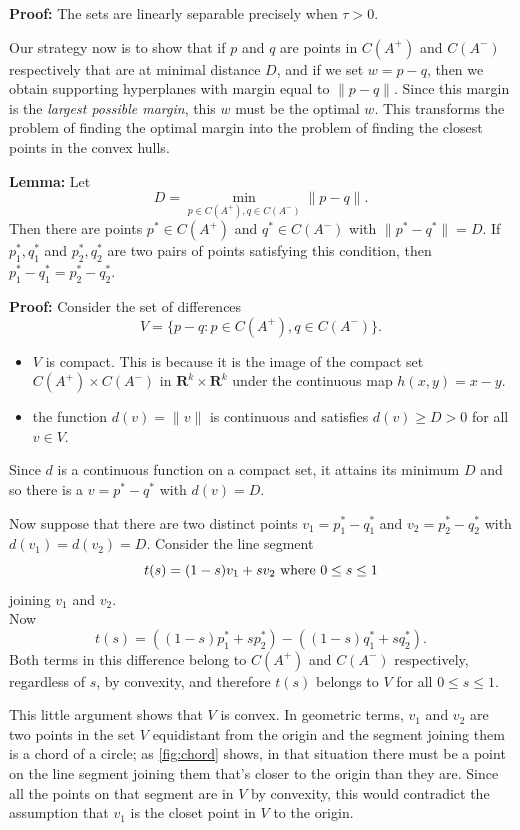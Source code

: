 \documentclass[
]{article}
\begin{document}
\textbf{Proof:} The sets are linearly separable precisely when
\(\tau>0\).

Our strategy now is to show that if \(p\) and \(q\) are points in
\(C(A^{+})\) and \(C(A^{-})\) respectively that are at minimal distance
\(D\), and if we set \(w=p-q\), then we obtain supporting hyperplanes
with margin equal to \(\|p-q\|\). Since this margin is the \emph{largest
possible margin}, this \(w\) must be the optimal \(w\). This transforms
the problem of finding the optimal margin into the problem of finding
the closest points in the convex hulls.

\textbf{Lemma:} Let \[
D=\min_{p\in C(A^{+}),q\in C(A^{-})} \|p-q\|.
\] Then there are points \(p^*\in C(A^{+})\) and \(q^{*}\in C(A^{-})\)
with \(\|p^{*}-q^{*}\|=D\). If \(p_1^{*},q_1^{*}\) and
\(p_2^{*},q_2^{*}\) are two pairs of points satisfying this condition,
then \(p_1^{*}-q_1^{*}=p_2^{*}-q_{2}^{*}\).

\textbf{Proof:} Consider the set of differences \[
V = \{p-q: p\in C(A^{+}),q\in C(A^{-})\}.
\]

\begin{itemize}
\item
  \(V\) is compact. This is because it is the image of the compact set
  \(C(A^{+})\times C(A^{-})\) in \(\mathbf{R}^{k}\times\mathbf{R}^{k}\)
  under the continuous map \(h(x,y)=x-y\).
\item
  the function \(d(v)=\|v\|\) is continuous and satisfies
  \(d(v)\ge D>0\) for all \(v\in V\).
\end{itemize}

Since \(d\) is a continuous function on a compact set, it attains its
minimum \(D\) and so there is a \(v=p^{*}-q^{*}\) with \(d(v)=D\).

Now suppose that there are two distinct points \(v_1=p_1^*-q_1^*\) and
\(v_2=p_2^*-q_2^*\) with \(d(v_1)=d(v_2)=D\). Consider the line segment
\[
t(s) = (1-s)v_1+sv_2\hbox{ where }0\le s\le 1
\] joining \(v_1\) and \(v_2\).\\
Now \[
t(s) = ((1-s)p_1^*+sp_2^*)-((1-s)q_1^*+sq_2^*).
\] Both terms in this difference belong to \(C(A^{+})\) and \(C(A^{-})\)
respectively, regardless of \(s\), by convexity, and therefore \(t(s)\)
belongs to \(V\) for all \(0\le s\le 1\).

This little argument shows that \(V\) is convex. In geometric terms,
\(v_1\) and \(v_2\) are two points in the set \(V\) equidistant from the
origin and the segment joining them is a chord of a circle; as
\cref{fig:chord} shows, in that situation there must be a point on the
line segment joining them that's closer to the origin than they are.
Since all the points on that segment are in \(V\) by convexity, this
would contradict the assumption that \(v_1\) is the closet point in
\(V\) to the origin.
\end{document}
